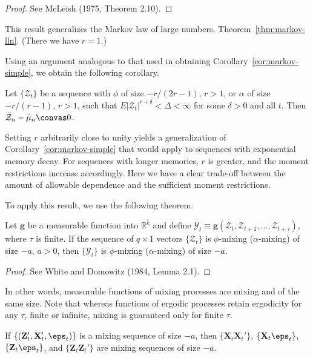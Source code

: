 \begin{proof}
See McLeish (1975, Theorem 2.10). \qedhere
\end{proof}

This result generalizes the Markov law of large numbers, Theorem~\ref{thm:markov-lln}. (There we have $r = 1$.)

Using an argument analogous to that used in obtaining Corollary~\ref{cor:markov-simple}, we obtain the following corollary.

\begin{corollary}\label{cor:mcleish}
Let $\{\mathcal{Z}_t\}$ be a sequence with $\phi$ of size $-r/(2r-1)$, $r > 1$, or $\alpha$ of size $-r/(r-1)$, $r > 1$, such that $E|\mathcal{Z}_t|^{r+\delta} < \Delta < \infty$ for some $\delta > 0$ and all $t$. Then $\bar{\mathcal{Z}}_n - \bar{\mu}_n \convas 0$.
\end{corollary}

Setting $r$ arbitrarily close to unity yields a generalization of Corollary~\ref{cor:markov-simple} that would apply to sequences with exponential memory decay. For sequences with longer memories, $r$ is greater, and the moment restrictions increase accordingly. Here we have a clear trade-off between the amount of allowable dependence and the sufficient moment restrictions.

To apply this result, we use the following theorem.

\begin{theorem}\label{thm:mixing-measurable}
Let $\mathbf{g}$ be a measurable function into $\mathbb{R}^k$ and define $\boldsymbol{\mathcal{Y}}_t \equiv \mathbf{g}(\boldsymbol{\mathcal{Z}}_t, \boldsymbol{\mathcal{Z}}_{t+1}, \ldots, \boldsymbol{\mathcal{Z}}_{t+\tau})$, where $\tau$ is finite. If the sequence of $q \times 1$ vectors $\{\boldsymbol{\mathcal{Z}}_t\}$ is $\phi$-mixing ($\alpha$-mixing) of size $-a$, $a > 0$, then $\{\boldsymbol{\mathcal{Y}}_t\}$ is $\phi$-mixing ($\alpha$-mixing) of size $-a$.
\end{theorem}

\begin{proof}
See White and Domowitz (1984, Lemma 2.1). \qedhere
\end{proof}

In other words, measurable functions of mixing processes are mixing and of the same size. Note that whereas functions of ergodic processes retain ergodicity for any $\tau$, finite or infinite, mixing is guaranteed only for finite $\tau$.

\begin{proposition}\label{prop:mixing-products}
If $\{(\mathbf{Z}_t', \mathbf{X}_t', \eps_t)\}$ is a mixing sequence of size $-a$, then $\{\mathbf{X}_t \mathbf{X}_t'\}$, $\{\mathbf{X}_t \eps_t\}$, $\{\mathbf{Z}_t \eps_t\}$, and $\{\mathbf{Z}_t \mathbf{Z}_t'\}$ are mixing sequences of size $-a$.
\end{proposition}

